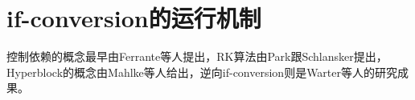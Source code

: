 \section{if-conversion的运行机制}

控制依赖的概念最早由Ferrante等人提出\cite{ferrante1987prodepgraitsuseopt}，RK算法由Park跟Schlansker提出\cite{JosephC.H.Park1991}，Hyperblock的概念由Mahlke等人给出\cite{ScottA.Mahlke1992a}，逆向if-conversion则是Warter等人的研究成果\cite{Warter1993}。





